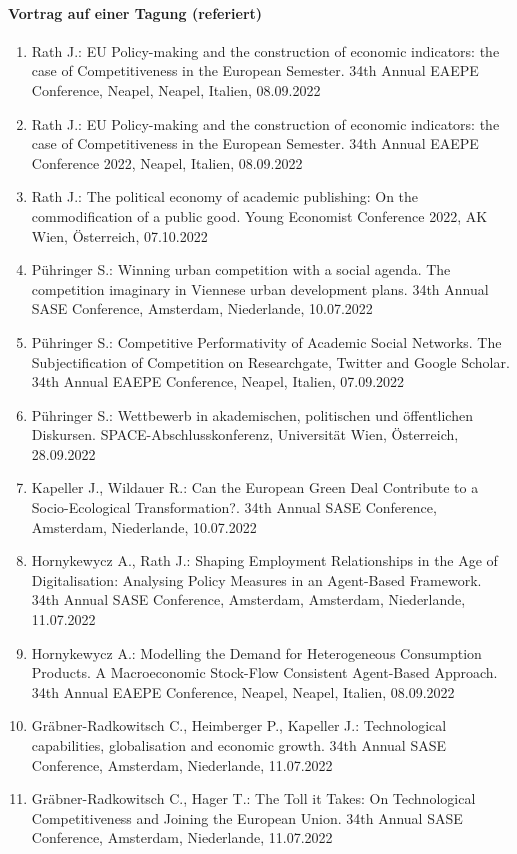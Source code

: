 \paragraph{Vortrag auf einer Tagung (referiert)}
\begin{enumerate}
	\item Rath J.: EU Policy-making and the construction of economic indicators: the case of Competitiveness in the European Semester. 34th Annual EAEPE Conference, Neapel, Neapel, Italien, 08.09.2022
	\item Rath J.: EU Policy-making and the construction of economic indicators: the case of Competitiveness in the European Semester. 34th Annual EAEPE Conference 2022, Neapel, Italien, 08.09.2022
	\item Rath J.: The political economy of academic publishing: On the commodification of a public good. Young Economist Conference 2022, AK Wien, Österreich, 07.10.2022
	\item Pühringer S.: Winning urban competition with a social agenda. The competition imaginary in Viennese urban development plans. 34th Annual SASE Conference, Amsterdam, Niederlande, 10.07.2022
	\item Pühringer S.: Competitive Performativity of Academic Social Networks. The Subjectification of Competition on Researchgate, Twitter and Google Scholar. 34th Annual EAEPE Conference, Neapel, Italien, 07.09.2022
	\item Pühringer S.: Wettbewerb in akademischen, politischen und öffentlichen Diskursen. SPACE-Abschlusskonferenz,  Universität Wien, Österreich, 28.09.2022
	\item Kapeller J., Wildauer R.: Can the European Green Deal Contribute to a Socio-Ecological Transformation?. 34th Annual SASE Conference, Amsterdam, Niederlande, 10.07.2022
	\item Hornykewycz A., Rath J.: Shaping Employment Relationships in the Age of Digitalisation: Analysing Policy Measures in an Agent-Based Framework. 34th Annual SASE Conference, Amsterdam, Amsterdam, Niederlande, 11.07.2022
	\item Hornykewycz A.: Modelling the Demand for Heterogeneous Consumption Products. A Macroeconomic Stock-Flow Consistent Agent-Based Approach. 34th Annual EAEPE Conference, Neapel, Neapel, Italien, 08.09.2022
	\item Gräbner-Radkowitsch C., Heimberger P., Kapeller J.: Technological capabilities, globalisation and economic growth. 34th Annual SASE Conference, Amsterdam, Niederlande, 11.07.2022
	\item Gräbner-Radkowitsch C., Hager T.: The Toll it Takes: On Technological Competitiveness and Joining the European Union. 34th Annual SASE Conference, Amsterdam, Niederlande, 11.07.2022

\end{enumerate}
